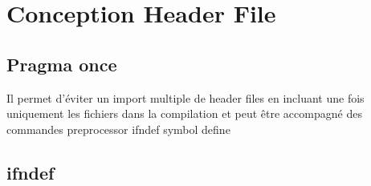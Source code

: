     \tableofcontents
    \clearpage
%
%
%
%    
%    
%    
%    
%    
%    


\section{Conception Header File}

\subsection{Pragma once}

Il permet d’éviter un import multiple de header files en incluant une fois uniquement les
fichiers dans la compilation et peut être accompagné des commandes preprocessor ifndef
symbol define

\subsection{ifndef}

